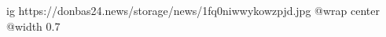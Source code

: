  
 
 
 
 

\ifcmt
  ig https://donbas24.news/storage/news/1fq0niwwykowzpjd.jpg
  @wrap center
  @width 0.7
\fi
